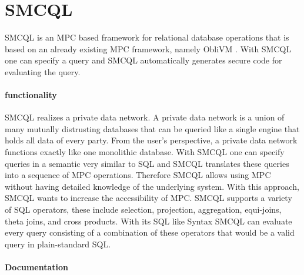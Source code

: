 \section{SMCQL}
SMCQL \cite{bater} is an MPC based framework for relational database operations that is based on an already existing MPC framework, namely ObliVM \cite{liu2015oblivm}. With SMCQL one can specify a query and SMCQL automatically generates secure code for evaluating the query. 
\paragraph{functionality}
SMCQL realizes a private data network. A private data network is a union of many mutually distrusting databases that can be queried like a single engine that holds all data of every party. From the user's perspective, a private data network functions exactly like one monolithic database. With SMCQL one can specify queries in a semantic very similar to SQL and SMCQL translates these queries into a sequence of MPC operations. Therefore SMCQL allows using MPC without having detailed knowledge of the underlying system. With this approach, SMCQL wants to increase the accessibility of MPC. SMCQL supports a variety of SQL operators, these include selection, projection, aggregation, equi-joins, theta joins, and cross products. With its SQL like Syntax SMCQL can evaluate every query consisting of a combination of these operators that would be a valid query in plain-standard SQL.  


\paragraph{Documentation}




